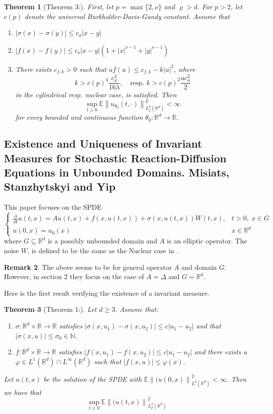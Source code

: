 \documentclass[a4paper,11pt]{article}%
\numberwithin{equation}{section}
\theoremstyle{plain}
\newtheorem{theorem}{Theorem}[section]
\theoremstyle{definition}
\newtheorem{remark}[theorem]{Remark}
\newcommand{\R}{\mathbb{R}}
\newcommand{\Norm}[1]{\left\|  #1   \right\|}
\begin{document}
	\begin{theorem}[Theorem 3:]
First, let $p=\max\{2,\nu\}$ and $\varrho >d$. For $p>2$, let $c(p)$ denote the universal Burkholder-Davis-Gundy constant. Assume that
		\begin{enumerate}
			\item $|\sigma(x) - \sigma(y)| \le c_\sigma |x-y|$
			\item $ |f(x)-f(y)| \le c_{\nu}|x-y|(1+|x|^{\nu -1} + |y|^{\nu -1}) $
			\item There exists $c_{f,k}>0$ such that $uf(u) \le c_{f,k} - k|u|^2$, where
				\[
					k > c(p)^4 \frac{c_\sigma^4}{16\lambda}, \quad \text{resp. } k > c(p)^2 \frac{ac_\sigma^2}{2}
				\]
			in the cylindrical resp. nuclear case, is satisfied. Then
				\[
					\sup_{t \ge 0} \mathbb{E}\Norm{u_{\theta_0}(t,\cdot)}^p_{L_\rho^p(\R^d)} < \infty
				\]
			for every bounded and continuous function $\theta_0:\R^d \to \R.$
		\end{enumerate}
	\end{theorem}

\subsection{Existence and Uniqueness of Invariant Measures for Stochastic Reaction-Diffusion Equations in Unbounded Domains. Misiats, Stanzhytskyi and Yip \cite{MSY15}}

This paper focuses on the SPDE
	\[
		\begin{cases}
			\frac{\partial}{\partial t} u(t,x) = A u(t,x) + f(x,u(t,x)) + \sigma(x,u(t,x)) \dot{W}(t,x), & t>0, \; x \in G
			\\ u(0,x) = u_0(x) & x \in \R^d
		\end{cases}
	\]
where $G \subseteq \R^d$ is a possibly unbounded domain and $A$ is an elliptic operator. The noise $W$, is defined to be the same as the Nuclear case in \cite{AM03}.

	\begin{remark}
		The above seems to be for general operator $A$ and domain $G$. However, in section 2 they focus on the case of $A = \Delta$ and $G=\R^d$.
	\end{remark}

Here is the first result verifying the existence of a invariant measure.
	\begin{theorem}[Theorem 1:]\label{T:MSY15th1}
Let $d \ge 3$. Assume that:
		\begin{enumerate}
			\item $\sigma : \R^d \times \R \to \R$ satisfies $|\sigma(x,u_1) - \sigma(x,u_2)| \le c|u_1-u_2|$ and that $|\sigma(x,u)| \le \sigma_0 \in \mathbb{N}$.
			\item $f: \R^d \times \R \to \R$ satisfies $|f(x,u_1) - f(x,u_2)| \le c|u_1-u_2|$ and there exists a $\varphi \in L^1(\R^d) \cap L^\infty(\R^d)$ such that $|f(x,u)| \le \varphi(x)$.
		\end{enumerate}
Let $u(t,x)$ be the solution of the SPDE with $\mathbb{E}\Norm{(u(0,x)}_{L^2(\R^d)}^2 < \infty$. Then we have that
	\[
		\sup_{t \ge 0 } \mathbb{E}\Norm{(u(t,x)}_{L^2_{\rho}(\R^d)}^2
	\]
	\end{theorem}
\end{document}
